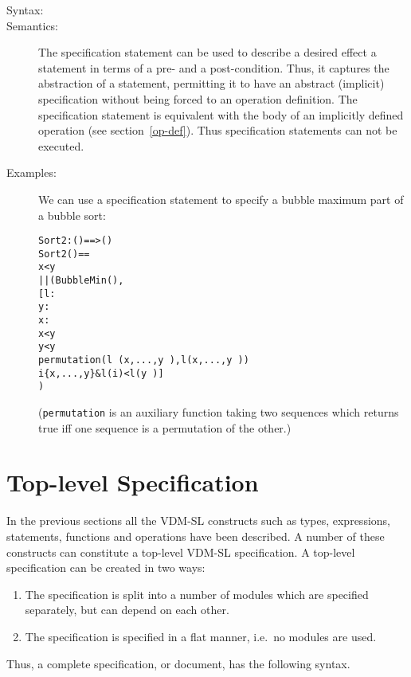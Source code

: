 \documentclass[\pformat,12pt]{article}
\begin{document}
\begin{description}
\item[Syntax:] 

\item[Semantics:] 

The specification statement can be used to describe a desired effect a
statement in terms of a pre- and a post-condition. Thus, it captures
the abstraction of a statement, permitting it to have an abstract
(implicit) specification without being forced to an operation
definition. The specification statement is equivalent with the body of
an implicitly defined operation (see section~\ref{op-def}). Thus
specification statements can not be executed.

\item[Examples:] We can use a specification statement to specify a
  bubble maximum part of a bubble sort:
  \begin{alltt}
  Sort2 : () ==> ()
  Sort2 () ==
     x < y 
      || (BubbleMin(),
          [ l : 
               y : 
               x : 
            x < y
            y < y~ 
                permutation (l~(x,...,y~),l(x,...,y~)) 
                 i  \{x,...,y\} & l(i) < l(y~)]
         )
  \end{alltt}
  (\texttt{permutation} is an auxiliary function taking two sequences
  which returns true iff one sequence is a permutation of the other.)


\end{description}


\newpage
\section{Top-level Specification}
\label{top-level}\label{modules}

In the previous sections all the  VDM-SL constructs such as types,
expressions, statements, functions and operations have been described. A
number of these constructs can constitute a top-level  VDM-SL
specification. A top-level specification can be created in two ways:
\begin{enumerate}
\item The specification is split into a number of modules which are
  specified separately, but can depend on each other.
\item The specification is specified in a flat manner, i.e.\ no modules are
  used.
\end{enumerate}
Thus, a complete specification, or document, has the following syntax.
\end{document}
